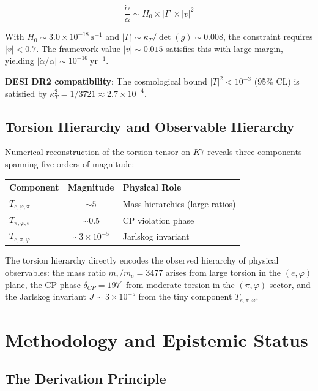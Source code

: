 \documentclass[11pt,a4paper]{article}
\newcommand{\Kseven}{K_7}
\newcommand{\CP}{\mathrm{CP}}
\def\CP{CP}%
\def\Kseven{K7}%
\begin{document}
$$\frac{\dot{\alpha}}{\alpha} \sim H_0 \times |\Gamma| \times |v|^2$$

With $H_0 \sim 3.0 \times 10^{-18}\ \mathrm{s}^{-1}$ and $|\Gamma| \sim \kappa_T/\det(g) \sim 0.008$, the constraint requires $|v| < 0.7$. The framework value $|v| \sim 0.015$ satisfies this with large margin, yielding $|\dot{\alpha}/\alpha| \sim 10^{-16}\ \mathrm{yr}^{-1}$.

\textbf{DESI DR2 compatibility}: The cosmological bound $|T|^2 < 10^{-3}$ (95\% CL) is satisfied by $\kappa_T^2 = 1/3721 \approx 2.7 \times 10^{-4}$.

\subsection{Torsion Hierarchy and Observable Hierarchy}

Numerical reconstruction of the torsion tensor on $\Kseven$ reveals three components spanning five orders of magnitude:

\begin{table}[H]
\centering
\begin{tabular}{lcl}
\toprule
Component & Magnitude & Physical Role \\
\midrule
$T_{e,\varphi,\pi}$ & $\sim 5$ & Mass hierarchies (large ratios) \\
$T_{\pi,\varphi,e}$ & $\sim 0.5$ & CP violation phase \\
$T_{e,\pi,\varphi}$ & $\sim 3 \times 10^{-5}$ & Jarlskog invariant \\
\bottomrule
\end{tabular}
\end{table}

The torsion hierarchy directly encodes the observed hierarchy of physical observables: the mass ratio $m_\tau/m_e = 3477$ arises from large torsion in the $(e,\varphi)$ plane, the CP phase $\delta_{\CP} = 197^\circ$ from moderate torsion in the $(\pi,\varphi)$ sector, and the Jarlskog invariant $J \sim 3 \times 10^{-5}$ from the tiny component $T_{e,\pi,\varphi}$.

\section{Methodology and Epistemic Status}

\subsection{The Derivation Principle}
\end{document}
